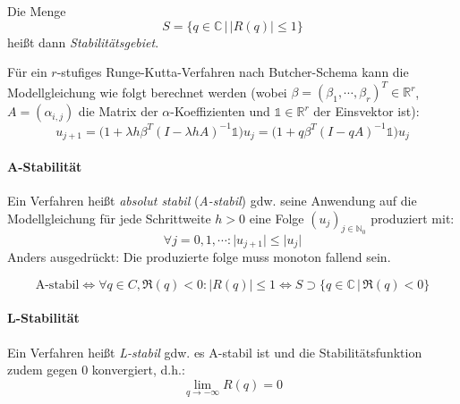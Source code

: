 \documentclass[a4paper, 11pt, accentcolor = tud3b]{tudreport}
\newcommand{\forwhich}{\ensuremath{{\,\vert\,}}}
\newcommand{\abs}[1]{\ensuremath{{\lvert #1 \rvert}}}
\newcommand{\C}{\ensuremath{\mathbb{C}}}
\newcommand{\R}{\ensuremath{\mathbb{R}}}
\newcommand{\N}{\ensuremath{\mathbb{N}}}
\begin{document}
			        Die Menge \[ S = \{ q \in \C \forwhich \abs{R(q)} \leq 1 \} \] heißt dann \textit{Stabilitätsgebiet}.
			        
			        Für ein \(r\)-stufiges Runge-Kutta-Verfahren nach Butcher-Schema kann die Modellgleichung wie folgt berechnet werden (wobei \( \beta = (\beta_1, \cdots, \beta_r)^T \in \R^r \), \( A = (\alpha_{i,j}) \) die Matrix der \(\alpha\)-Koeffizienten und \( \mathbb{1} \in \R^r \) der Einsvektor ist):
			        \begin{equation*}
				        u_{j+1} = \big( 1 + \lambda h \beta^T (I - \lambda h A)^{-1} \mathbb{1} \big) u_j = \big( 1 + q \beta^T (I - qA)^{-1} \mathbb{1} \big) u_j
			        \end{equation*}
	        
		        \paragraph{A-Stabilität}
		            Ein Verfahren heißt \textit{absolut stabil} (\textit{A-stabil}) gdw. seine Anwendung auf die Modellgleichung für jede Schrittweite \( h > 0 \) eine Folge \( (u_j)_{j \in \N_0} \) produziert mit:
		            \begin{equation*}
			            \forall j = 0, 1, \cdots : \abs{u_{j+1}} \leq \abs{u_j}
		            \end{equation*}
		            Anders ausgedrückt: Die produzierte folge muss monoton fallend sein.
		            
		            \begin{equation*}
			            \textrm{A-stabil} \iff \forall q \in C, \Re(q) < 0 : \abs{R(q)} \leq 1 \iff S \supset \{ q \in \C \forwhich \Re(q) < 0 \}
		            \end{equation*}
		        
		        \paragraph{L-Stabilität}
			        Ein Verfahren heißt \textit{L-stabil} gdw. es A-stabil ist und die Stabilitätsfunktion zudem gegen \(0\) konvergiert, d.h.:
			        \begin{equation*}
				        \lim\limits_{q \rightarrow -\infty} R(q) = 0
			        \end{equation*}
	
\end{document}

